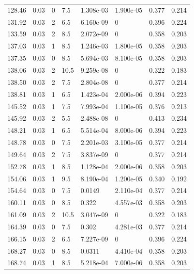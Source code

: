 \documentclass[preview]{standalone}
\begin{document}
{{{\begin{tabular}{L{1.2cm}C{1.2cm} C{0.3cm}C{0.5cm} C{1.4cm}C{1.4cm} C{1.4cm}C{1.4cm}}
  128.46  &  0.03  & 0     & 7.5 &  1.308e-03  & 1.900e-05  & 0.377 &  0.214   \\ 
  131.92  &  0.03  & 2     & 6.5 &  6.160e-09  & 0  & 0.396 &  0.224   \\ 
  133.59  &  0.03  & 2     & 8.5 &  2.072e-09  & 0  & 0.358 &  0.203   \\ 
  137.03  &  0.03  & 1     & 8.5 &  1.246e-03  & 1.800e-05  & 0.358 &  0.203   \\ 
  137.35  &  0.03  & 0     & 8.5 &  5.694e-03  & 8.100e-05  & 0.358 &  0.203   \\ 
  138.06  &  0.03  & 2     & 10.5 &  9.259e-08  & 0  & 0.322 &  0.183   \\ 
  138.50  &  0.03  & 2     & 7.5 &  2.804e-08  & 0  & 0.377 &  0.214   \\ 
  138.81  &  0.03  & 1     & 6.5 &  1.423e-04  & 2.000e-06  & 0.394 &  0.223   \\ 
  145.52  &  0.03  & 1     & 7.5 &  7.993e-04  & 1.100e-05  & 0.376 &  0.213   \\ 
  145.92  &  0.03  & 2     & 5.5 &  2.488e-08  & 0  & 0.413 &  0.234   \\ 
  148.21  &  0.03  & 1     & 6.5 &  5.514e-04  & 8.000e-06  & 0.394 &  0.223   \\ 
  148.78  &  0.03  & 0     & 7.5 &  2.201e-03  & 3.100e-05  & 0.377 &  0.214   \\ 
  149.64  &  0.03  & 2     & 7.5 &  3.837e-09  & 0  & 0.377 &  0.214   \\ 
  152.78  &  0.03  & 1     & 8.5 &  1.128e-04  & 2.000e-06  & 0.358 &  0.203   \\ 
  154.06  &  0.03  & 1     & 9.5 &  8.190e-04  & 1.200e-05  & 0.340 &  0.192   \\ 
  154.64  &  0.03  & 0     & 7.5 &  0.0149  & 2.110e-04  & 0.377 &  0.214   \\ 
  160.11  &  0.03  & 0     & 8.5 &  0.322  & 4.557e-03  & 0.358 &  0.203   \\ 
  161.09  &  0.03  & 2     & 10.5 &  3.047e-09  & 0  & 0.322 &  0.183   \\ 
  164.39  &  0.03  & 0     & 7.5 &  0.302  & 4.281e-03  & 0.377 &  0.214   \\ 
  166.15  &  0.03  & 2     & 6.5 &  7.227e-09  & 0  & 0.396 &  0.224   \\ 
  168.27  &  0.03  & 0     & 8.5 &  0.0311  & 4.410e-04  & 0.358 &  0.203   \\ 
  168.74  &  0.03  & 1     & 8.5 &  5.218e-04  & 7.000e-06  & 0.358 &  0.203   \\ 

\end{tabular}}}}
\end{document}
